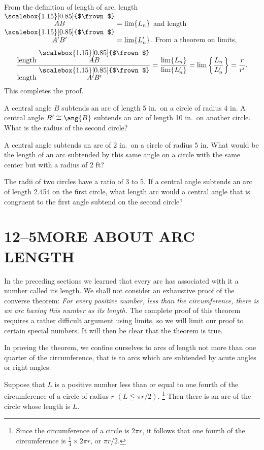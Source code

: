 \documentclass[11pt]{book}
\theoremstyle{bkplain}
\theoremstyle{XIplainnote}
\theoremstyle{bkplain}
\newcommand{\XIIarc}[1]{\overset{\raisebox{-0.25ex}{\scalebox{1.15}[0.85]{$\frown$}}}{#1}}
\newcommand{\XIIsymfoot}[1]{%
  \begingroup
  \renewcommand{\thefootnote}{\fnsymbol{footnote}}%
  \setcounter{footnote}{0}%
  \footnote{#1}%
  \endgroup}
\theoremstyle{bkplain}
\begin{document}
From the definition of length of arc, length $\XIIarc{AB} = \lim \{L_n\}$ and
length $\XIIarc{A'B'} = \lim \{L'_n\}$. From a theorem on limits,
\[
\frac{\text{length } \XIIarc{AB}}{\text{length } \XIIarc{A'B'}} =
\frac{\lim \{L_n\}}{\lim \{L'_n\}} = \lim \left\{\frac{L_n}{L'_n}\right\} =
\frac{r}{r'}.
\]
This completes the proof.

\begin{exercisecols}
\begin{exlist}
\item A central angle $B$ subtends an arc of length 5 in.\ on a circle of radius
      4 in. A central angle $B' \cong \ang{B}$ subtends an arc of length 10 in.\
      on another circle. What is the radius of the second circle?
\item A central angle subtends an arc of 2 in.\ on a circle of radius 5 in. What
      would be the length of an arc subtended by this same angle on a circle
      with the same center but with a radius of 2 ft?
\item The radii of two circles have a ratio of 3 to 5. If a central angle
      subtends an arc of length 2.454 on the first circle, what length arc would
      a central angle that is congruent to the first angle subtend on the second
      circle?
\end{exlist}
\end{exercisecols}

\section*{12--5\quad MORE ABOUT ARC LENGTH}

In the preceding sections we learned that every arc has associated with it a
number called its length. We shall not consider an exhaustive proof of the
converse theorem: \emph{For every positive number, less than the circumference,
there is an arc having this number as its length.} The complete proof of this
theorem requires a rather difficult argument using limits, so we will limit our
proof to certain special numbers. It will then be clear that the theorem is
true.

In proving the theorem, we confine ourselves to arcs of length not more than one
quarter of the circumference, that is to arcs which are subtended by acute
angles or right angles.

\begin{theorem}
Suppose that $L$ is a positive number less than or equal to one fourth of the
circumference of a circle of radius $r$ $(L \leqq \pi r/2)$.\XIIsymfoot{Since
the circumference of a circle is $2\pi r$, it follows that one fourth of the
circumference is $\frac{1}{4} \times 2\pi r$, or $\pi r/2$.} Then there is an
arc of the circle whose length is $L$.
\end{theorem}
\end{document}
